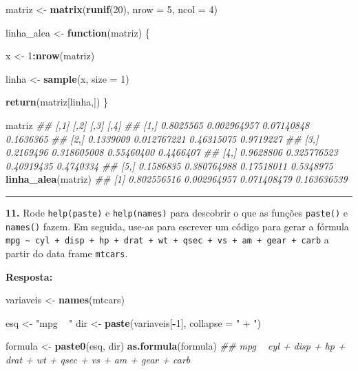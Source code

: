 \documentclass[
]{book}
\newenvironment{Shaded}{\begin{snugshade}}{\end{snugshade}}
\newcommand{\CommentTok}[1]{\textcolor[rgb]{0.56,0.35,0.01}{\textit{#1}}}
\newcommand{\ControlFlowTok}[1]{\textcolor[rgb]{0.13,0.29,0.53}{\textbf{#1}}}
\newcommand{\DataTypeTok}[1]{\textcolor[rgb]{0.13,0.29,0.53}{#1}}
\newcommand{\DecValTok}[1]{\textcolor[rgb]{0.00,0.00,0.81}{#1}}
\newcommand{\KeywordTok}[1]{\textcolor[rgb]{0.13,0.29,0.53}{\textbf{#1}}}
\newcommand{\NormalTok}[1]{#1}
\newcommand{\OperatorTok}[1]{\textcolor[rgb]{0.81,0.36,0.00}{\textbf{#1}}}
\newcommand{\StringTok}[1]{\textcolor[rgb]{0.31,0.60,0.02}{#1}}
\begin{document}
\begin{Shaded}
\begin{Highlighting}[]
\NormalTok{matriz <-}\StringTok{ }\KeywordTok{matrix}\NormalTok{(}\KeywordTok{runif}\NormalTok{(}\DecValTok{20}\NormalTok{), }\DataTypeTok{nrow =} \DecValTok{5}\NormalTok{, }\DataTypeTok{ncol =} \DecValTok{4}\NormalTok{)}

\NormalTok{linha_alea <-}\StringTok{ }\ControlFlowTok{function}\NormalTok{(matriz) \{}
  
\NormalTok{  x <-}\StringTok{ }\DecValTok{1}\OperatorTok{:}\KeywordTok{nrow}\NormalTok{(matriz)}
  
\NormalTok{  linha <-}\StringTok{ }\KeywordTok{sample}\NormalTok{(x, }\DataTypeTok{size =} \DecValTok{1}\NormalTok{)}
  
  \KeywordTok{return}\NormalTok{(matriz[linha,])}
\NormalTok{\}}

\NormalTok{matriz}
\CommentTok{##           [,1]        [,2]       [,3]      [,4]}
\CommentTok{## [1,] 0.8025565 0.002964957 0.07140848 0.1636365}
\CommentTok{## [2,] 0.1339009 0.012767221 0.46315075 0.9719227}
\CommentTok{## [3,] 0.2169496 0.318605008 0.55460400 0.4466407}
\CommentTok{## [4,] 0.9628806 0.325776523 0.40919435 0.4740334}
\CommentTok{## [5,] 0.1586835 0.380764988 0.17518011 0.5348975}
\KeywordTok{linha_alea}\NormalTok{(matriz)}
\CommentTok{## [1] 0.802556516 0.002964957 0.071408479 0.163636539}
\end{Highlighting}
\end{Shaded}

\begin{center}\rule{0.5\linewidth}{0.5pt}\end{center}

\textbf{11.} Rode \texttt{help(paste)} e \texttt{help(names)} para descobrir o que as funções \texttt{paste()} e \texttt{names()} fazem. Em seguida, use-as para escrever um código para gerar a fórmula \texttt{mpg\ \textasciitilde{}\ cyl\ +\ disp\ +\ hp\ +\ drat\ +\ wt\ +\ qsec\ +\ vs\ +\ am\ +\ gear\ +\ carb} a partir do data frame \texttt{mtcars}.

\textbf{Resposta:}

\begin{Shaded}
\begin{Highlighting}[]
\NormalTok{variaveis <-}\StringTok{ }\KeywordTok{names}\NormalTok{(mtcars)}

\NormalTok{esq <-}\StringTok{ "mpg ~ "}
\NormalTok{dir <-}\StringTok{ }\KeywordTok{paste}\NormalTok{(variaveis[}\OperatorTok{-}\DecValTok{1}\NormalTok{], }\DataTypeTok{collapse =} \StringTok{" + "}\NormalTok{)}

\NormalTok{formula <-}\StringTok{ }\KeywordTok{paste0}\NormalTok{(esq, dir)}
\KeywordTok{as.formula}\NormalTok{(formula)}
\CommentTok{## mpg ~ cyl + disp + hp + drat + wt + qsec + vs + am + gear + carb}
\end{Highlighting}
\end{Shaded}
\end{document}

